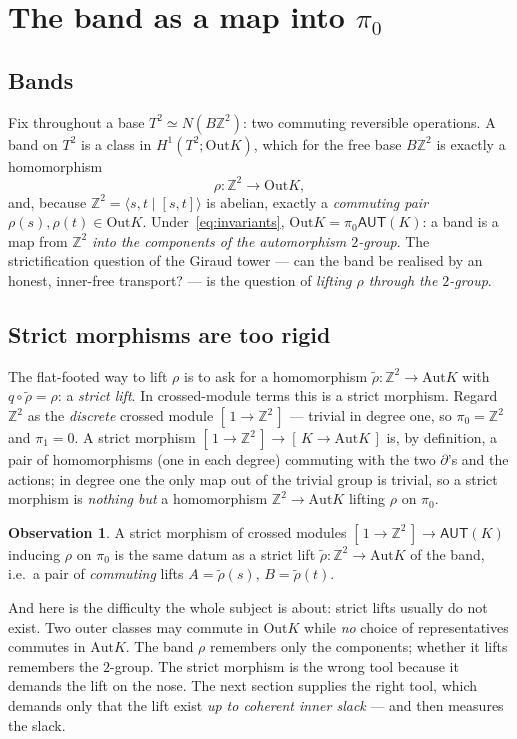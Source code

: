 \documentclass[11pt]{article}
\theoremstyle{definition}
\newtheorem{observation}[theorem]{Observation}
\newcommand{\Z}{\mathbb{Z}}
\newcommand{\Aut}{\mathrm{Aut}}
\newcommand{\Out}{\mathrm{Out}}
\newcommand{\gp}[1]{\langle #1\rangle}
\newcommand{\AUT}{\mathsf{AUT}}
\newcommand{\pizero}{\pi_0}
\newcommand{\pione}{\pi_1}
\begin{document}
\section{The band as a map into \texorpdfstring{$\pizero$}{pi0}}\label{sec:band}

\subsection{Bands}

Fix throughout a base $T^2\simeq N(B\Z^2)$: two commuting reversible operations. A band on $T^2$ is
a class in $H^1(T^2;\Out K)$, which for the free base $B\Z^2$ is exactly a homomorphism
\[
\rho\colon\Z^2\longrightarrow\Out K,
\]
and, because $\Z^2=\gp{s,t\mid [s,t]}$ is abelian, exactly a \emph{commuting pair}
$\rho(s),\rho(t)\in\Out K$. Under~\eqref{eq:invariants}, $\Out K=\pizero\AUT(K)$: a band is a map
from $\Z^2$ \emph{into the components of the automorphism $2$-group}. The strictification question
of the Giraud tower --- can the band be realised by an honest, inner-free transport? --- is the
question of \emph{lifting $\rho$ through the $2$-group}.

\subsection{Strict morphisms are too rigid}

The flat-footed way to lift $\rho$ is to ask for a homomorphism $\tilde\rho\colon\Z^2\to\Aut K$ with
$q\circ\tilde\rho=\rho$: a \emph{strict lift}. In crossed-module terms this is a strict morphism.
Regard $\Z^2$ as the \emph{discrete} crossed module $[\,1\to\Z^2\,]$ --- trivial in degree one, so
$\pizero=\Z^2$ and $\pione=0$. A strict morphism $[\,1\to\Z^2\,]\to[\,K\to\Aut K\,]$ is, by
definition, a pair of homomorphisms (one in each degree) commuting with the two $\partial$'s and the
actions; in degree one the only map out of the trivial group is trivial, so a strict morphism is
\emph{nothing but} a homomorphism $\Z^2\to\Aut K$ lifting $\rho$ on $\pizero$.

\begin{observation}\label{obs:strict}
A strict morphism of crossed modules $[\,1\to\Z^2\,]\to\AUT(K)$ inducing $\rho$ on $\pizero$ is the
same datum as a strict lift $\tilde\rho\colon\Z^2\to\Aut K$ of the band, i.e.\ a pair of
\emph{commuting} lifts $A=\tilde\rho(s)$, $B=\tilde\rho(t)$.
\end{observation}

And here is the difficulty the whole subject is about: strict lifts usually do not exist. Two outer
classes may commute in $\Out K$ while \emph{no} choice of representatives commutes in $\Aut K$. The
band $\rho$ remembers only the components; whether it lifts remembers the $2$-group. The strict
morphism is the wrong tool because it demands the lift on the nose. The next section supplies the
right tool, which demands only that the lift exist \emph{up to coherent inner slack} --- and then
measures the slack.
\end{document}
